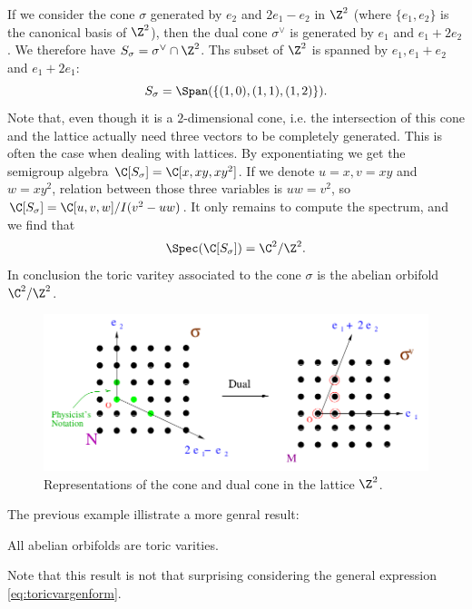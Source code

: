 \documentclass{worksheetclass}
\begin{document}
        \begin{examp*}
            If we consider the cone $\sigma$ generated by $e_2$ and $2e_1-e_2$ in $\Z^2$ (where $\{e_1,e_2\}$ is the canonical basis of $\Z^2$), then the dual cone $\sigma^\vee$ is generated by $e_1$ and $e_1+2e_2$. We therefore have $S_\sigma=\sigma^\vee\cap\Z^2$. Ths subset of $\Z^2$ is spanned by $e_1,e_1+e_2$ and $e_1+2e_1$:
            \begin{equation}
                S_\sigma=\Span(\{(1,0),(1,1),(1,2)\}).
            \end{equation}
            Note that, even though it is a $2$-dimensional cone, i.e. the intersection of this cone and the lattice actually need three vectors to be completely generated. This is often the case when dealing with lattices.
            By exponentiating we get the semigroup algebra $\C[S_\sigma]=\C[x,xy,xy^2]$. If we denote $u=x,v=xy$ and $w=xy^2$, relation between those three variables is $uw=v^2$, so $\C[S_\sigma]=\C[u,v,w]/I(v^2-uw)$. It only remains to compute the spectrum, and we find that
            \begin{equation}
                \Spec(\C[S_\sigma])=\C^2/\Z^2.
            \end{equation}
            In conclusion the toric varitey associated to the cone $\sigma$ is the abelian orbifold $\C^2/\Z^2$.
        \end{examp*}
        \begin{figure}[H]
            \centering
            \includegraphics[scale=0.4]{Pictures/toricdiagZ2orbifold.png}
            \caption{Representations of the cone and dual cone in the lattice $\Z^2$.}
        \end{figure}

        The previous example illistrate a more genral result:
        \begin{prop*}
            All abelian orbifolds are toric varities.
        \end{prop*}
        Note that this result is not that surprising considering the general expression \eqref{eq:toricvargenform}.
\end{document}
